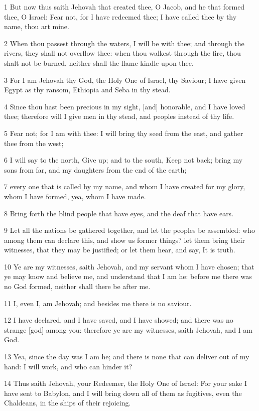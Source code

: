 \par 1 But now thus saith Jehovah that created thee, O Jacob, and he that formed thee, O Israel: Fear not, for I have redeemed thee; I have called thee by thy name, thou art mine.
\par 2 When thou passest through the waters, I will be with thee; and through the rivers, they shall not overflow thee: when thou walkest through the fire, thou shalt not be burned, neither shall the flame kindle upon thee.
\par 3 For I am Jehovah thy God, the Holy One of Israel, thy Saviour; I have given Egypt as thy ransom, Ethiopia and Seba in thy stead.
\par 4 Since thou hast been precious in my sight, [and] honorable, and I have loved thee; therefore will I give men in thy stead, and peoples instead of thy life.
\par 5 Fear not; for I am with thee: I will bring thy seed from the east, and gather thee from the west;
\par 6 I will say to the north, Give up; and to the south, Keep not back; bring my sons from far, and my daughters from the end of the earth;
\par 7 every one that is called by my name, and whom I have created for my glory, whom I have formed, yea, whom I have made.
\par 8 Bring forth the blind people that have eyes, and the deaf that have ears.
\par 9 Let all the nations be gathered together, and let the peoples be assembled: who among them can declare this, and show us former things? let them bring their witnesses, that they may be justified; or let them hear, and say, It is truth.
\par 10 Ye are my witnesses, saith Jehovah, and my servant whom I have chosen; that ye may know and believe me, and understand that I am he: before me there was no God formed, neither shall there be after me.
\par 11 I, even I, am Jehovah; and besides me there is no saviour.
\par 12 I have declared, and I have saved, and I have showed; and there was no strange [god] among you: therefore ye are my witnesses, saith Jehovah, and I am God.
\par 13 Yea, since the day was I am he; and there is none that can deliver out of my hand: I will work, and who can hinder it?
\par 14 Thus saith Jehovah, your Redeemer, the Holy One of Israel: For your sake I have sent to Babylon, and I will bring down all of them as fugitives, even the Chaldeans, in the ships of their rejoicing.
